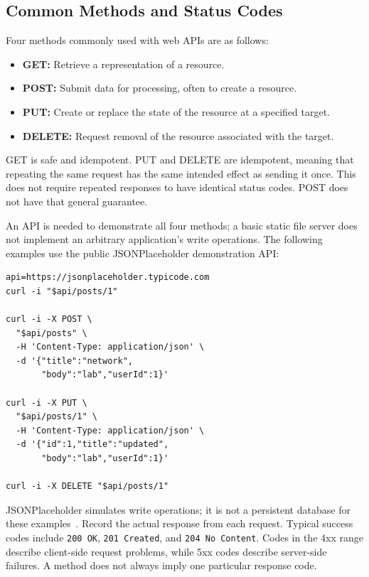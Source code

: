 \documentclass[journal]{IEEEtran}
\begin{document}
\subsection{Common Methods and Status Codes}
Four methods commonly used with web APIs are as follows:
\begin{itemize}
    \item \textbf{GET:} Retrieve a representation of a resource.
    \item \textbf{POST:} Submit data for processing, often to create a resource.
    \item \textbf{PUT:} Create or replace the state of the resource at a specified target.
    \item \textbf{DELETE:} Request removal of the resource associated with the target.
\end{itemize}
GET is safe and idempotent. PUT and DELETE are idempotent, meaning that repeating the same request has the same intended effect as sending it once. This does not require repeated responses to have identical status codes. POST does not have that general guarantee.

An API is needed to demonstrate all four methods; a basic static file server does not implement an arbitrary application's write operations. The following examples use the public JSONPlaceholder demonstration API:
\begin{lstlisting}
api=https://jsonplaceholder.typicode.com
curl -i "$api/posts/1"

curl -i -X POST \
  "$api/posts" \
  -H 'Content-Type: application/json' \
  -d '{"title":"network",
       "body":"lab","userId":1}'

curl -i -X PUT \
  "$api/posts/1" \
  -H 'Content-Type: application/json' \
  -d '{"id":1,"title":"updated",
       "body":"lab","userId":1}'

curl -i -X DELETE "$api/posts/1"
\end{lstlisting}
JSONPlaceholder simulates write operations; it is not a persistent database for these examples~\cite{jsonplaceholder}. Record the actual response from each request. Typical success codes include \texttt{200 OK}, \texttt{201 Created}, and \texttt{204 No Content}. Codes in the 4xx range describe client-side request problems, while 5xx codes describe server-side failures. A method does not always imply one particular response code.
\end{document}
